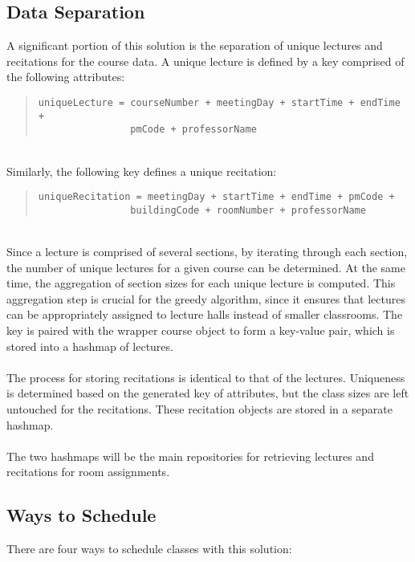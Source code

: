 \documentclass[12pt]{article}
\begin{document}
\subsection{Data Separation}
A significant portion of this solution is the separation of unique lectures and recitations for the course data. A unique lecture is defined by a key comprised of the following attributes:

\begin{quote}
\begin{verbatim}
uniqueLecture = courseNumber + meetingDay + startTime + endTime + 
				pmCode + professorName
\end{verbatim}
\end{quote}

\hfill\\
Similarly, the following key defines a unique recitation:

\begin{quote}
\begin{verbatim}
uniqueRecitation = meetingDay + startTime + endTime + pmCode + 
				buildingCode + roomNumber + professorName
\end{verbatim}
\end{quote}

\hfill\\
Since a lecture is comprised of several sections, by iterating through each section, the number of unique lectures for a given course can be determined. At the same time, the aggregation of section sizes for each unique lecture is computed. This aggregation step is crucial for the greedy algorithm, since it ensures that lectures can be appropriately assigned to lecture halls instead of smaller classrooms. The key is paired with the wrapper course object to form a key-value pair, which is stored into a hashmap of lectures. 
\\\\
The process for storing recitations is identical to that of the lectures. Uniqueness is determined based on the generated key of attributes, but the class sizes are left untouched for the recitations. These recitation objects are stored in a separate hashmap.
\\\\
The two hashmaps will be the main repositories for retrieving lectures and recitations for room assignments.

\subsection{Ways to Schedule}
There are four ways to schedule classes with this solution:
\end{document}

